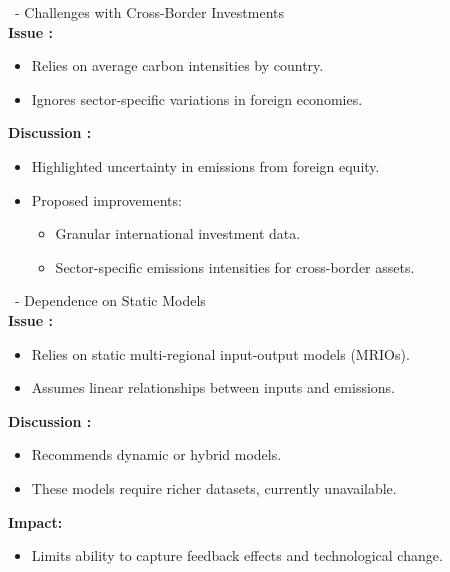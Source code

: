 \documentclass[10pt]{beamer}
\begin{document}
\begin{frame}{\subsecname \  - \subsubsecname}
    Challenges with Cross-Border Investments \\
    \textbf{Issue :}
    \begin{itemize}
        \item Relies on average carbon intensities by country.
        \item Ignores sector-specific variations in foreign economies.
    \end{itemize}
    \vspace{0.3cm}
    \textbf{Discussion :}
    \begin{itemize}
        \item Highlighted uncertainty in emissions from foreign equity.
        \item Proposed improvements:
        \begin{itemize}
            \item Granular international investment data.
            \item Sector-specific emissions intensities for cross-border assets.
        \end{itemize}
    \end{itemize}
\end{frame}

\begin{frame}{\subsecname \  - \subsubsecname}
    Dependence on Static Models \\
    \textbf{Issue :}
    \begin{itemize}
        \item Relies on static multi-regional input-output models (MRIOs).
        \item Assumes linear relationships between inputs and emissions.
    \end{itemize}
    \vspace{0.3cm}
    \textbf{Discussion :}
    \begin{itemize}
        \item Recommends dynamic or hybrid models.
        \item These models require richer datasets, currently unavailable.
    \end{itemize}
    \vspace{0.3cm}
    \textbf{Impact:}
    \begin{itemize}
        \item Limits ability to capture feedback effects and technological change.
    \end{itemize}
\end{frame}
\end{document}
